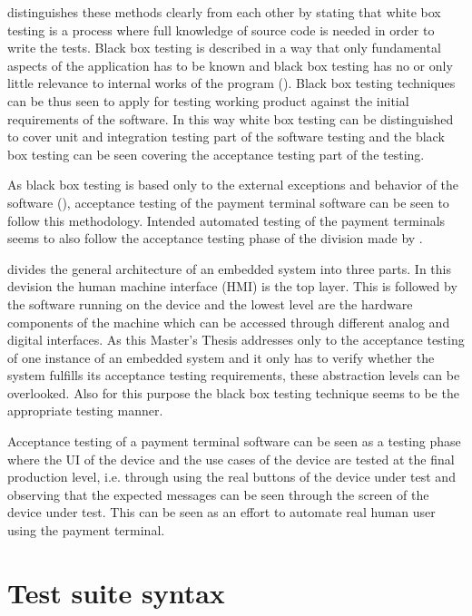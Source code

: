 \emph{\cite{khan2012comparative}} distinguishes these methods clearly from each other by stating that white box testing is a process where full knowledge of source code is needed in order to write the tests. Black box testing is described in a way that only fundamental aspects of the application has to be known and black box testing has no or only little relevance to internal works of the program (\emph{\cite{pressman2005software}}). Black box testing techniques can be thus seen to apply for testing working product against the initial requirements of the software. In this way white box testing can be distinguished to cover unit and integration testing part of the software testing and the black box testing can be seen covering the acceptance testing part of the testing.

As black box testing is based only to the external exceptions and behavior of the software (\emph{\cite{khan2012comparative}}), acceptance testing of the payment terminal software can be seen to follow this methodology. Intended automated testing of the payment terminals seems to also follow the acceptance testing phase of the division made by \emph{\cite{khan2012comparative}}.

\emph{\cite{Ramler}} divides the general architecture of an embedded system into three parts. In this devision the human machine interface (HMI) is the top layer. This is followed by the software running on the device and the lowest level are the hardware components of the machine which can be accessed through different analog and digital interfaces. As this Master's Thesis addresses only to the acceptance testing of one instance of an embedded system and it only has to verify whether the system fulfills its acceptance testing requirements, these abstraction levels can be overlooked. Also for this purpose the black box testing technique seems to be the appropriate testing manner.

Acceptance testing of a payment terminal software can be seen as a testing phase where the UI of the device and the use cases of the device are tested at the final production level, i.e. through using the real buttons of the device under test and observing that the expected messages can be seen through the screen of the device under test. This can be seen as an effort to automate real human user using the payment terminal.

\section{Test suite syntax}
\label{section:test suite syntax}

